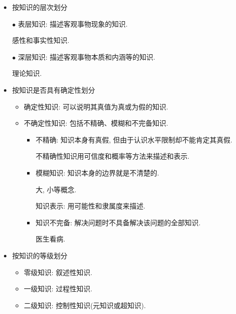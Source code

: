 \begin{itemize}
\item 按知识的层次划分

    $\bullet$ 表层知识: 描述客观事物现象的知识.
    \begin{example}
        感性和事实性知识.
    \end{example}

    $\bullet$ 深层知识: 描述客观事物本质和内涵等的知识.
    \begin{example}
      理论知识.
    \end{example}

\item 按知识是否具有确定性划分
\begin{itemize}
       \item 确定性知识: 可以说明其真值为真或为假的知识.

        \item 不确定性知识: 包括不精确、模糊和不完备知识.

       \begin{itemize}
        \item 不精确: 知识本身有真假, 但由于认识水平限制却不能肯定其真假.

        \begin{remark}
          不精确性知识用可信度和概率等方法来描述和表示.
        \end{remark}

        \item 模糊知识: 知识本身的边界就是不清楚的.
        \begin{example}
          大, 小等概念.
        \end{example}

           知识表示: 用可能性和隶属度来描述.

        \item 知识不完备: 解决问题时不具备解决该问题的全部知识.
        \begin{example}
          医生看病.
        \end{example}
       \end{itemize}
     \end{itemize}
\item 按知识的等级划分
    \begin{itemize}
       \item 零级知识: 叙述性知识.
       \item 一级知识: 过程性知识.
       \item 二级知识: 控制性知识(元知识或超知识).
    \end{itemize}
\end{itemize}
